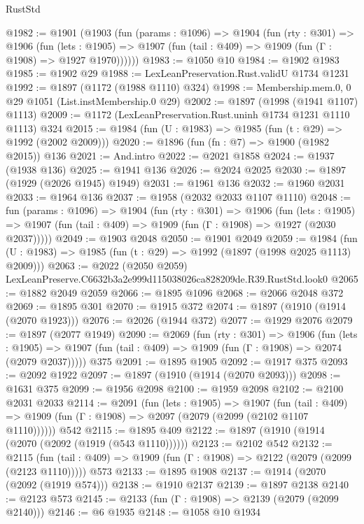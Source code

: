 \begin{lexlean}{RustStd}
\begin{coremodule}
@1982 := @1901
    (@1903
      (fun (params : @1096) =>
      @1904
        (fun (rty : @301) =>
        @1906
          (fun (lets : @1905) =>
          @1907 (fun (tail : @409) => @1909 (fun (Γ : @1908) => @1927 @1970))))))
@1983 := @1050 @10
@1984 := @1902 @1983
@1985 := @1902 @29
@1988 := LexLeanPreservation.Rust.validU @1734 @1231
@1992 := @1897 (@1172 (@1988 @1110) @324)
@1998 := Membership.mem.{0, 0} @29 @1051 (List.instMembership.{0} @29)
@2002 := @1897 (@1998 (@1941 @1107) @1113)
@2009 := @1172 (LexLeanPreservation.Rust.uninh @1734 @1231 @1110 @1113) @324
@2015 := @1984 (fun (U : @1983) => @1985 (fun (t : @29) => @1992 (@2002 @2009)))
@2020 := @1896 (fun (fn : @7) => @1900 (@1982 @2015)) @136
@2021 := And.intro
@2022 := @2021 @1858
@2024 := @1937 (@1938 @136)
@2025 := @1941 @136
@2026 := @2024 @2025
@2030 := @1897 (@1929 (@2026 @1945) @1949)
@2031 := @1961 @136
@2032 := @1960 @2031
@2033 := @1964 @136
@2037 := @1958 (@2032 @2033 @1107 @1110)
@2048 := fun (params : @1096) =>
  @1904
    (fun (rty : @301) =>
    @1906
      (fun (lets : @1905) =>
      @1907 (fun (tail : @409) => @1909 (fun (Γ : @1908) => @1927 (@2030 @2037)))))
@2049 := @1903 @2048
@2050 := @1901 @2049
@2059 := @1984 (fun (U : @1983) => @1985 (fun (t : @29) => @1992 (@1897 (@1998 @2025 @1113) @2009)))
@2063 := @2022 (@2050 @2059) LexLeanPreserve.C6632b3a2e999d115038026ca828209de.R39.RustStd.look0
@2065 := @1882 @2049 @2059
@2066 := @1895 @1096
@2068 := @2066 @2048 @372
@2069 := @1895 @301
@2070 := @1915 @372
@2074 := @1897 (@1910 (@1914 (@2070 @1923)))
@2076 := @2026 (@1944 @372)
@2077 := @1929 @2076
@2079 := @1897 (@2077 @1949)
@2090 := @2069
    (fun (rty : @301) =>
    @1906
      (fun (lets : @1905) =>
      @1907 (fun (tail : @409) => @1909 (fun (Γ : @1908) => @2074 (@2079 @2037)))))
    @375
@2091 := @1895 @1905
@2092 := @1917 @375
@2093 := @2092 @1922
@2097 := @1897 (@1910 (@1914 (@2070 @2093)))
@2098 := @1631 @375
@2099 := @1956 @2098
@2100 := @1959 @2098
@2102 := @2100 @2031 @2033
@2114 := @2091
    (fun (lets : @1905) =>
    @1907
      (fun (tail : @409) => @1909 (fun (Γ : @1908) => @2097 (@2079 (@2099 (@2102 @1107 @1110))))))
    @542
@2115 := @1895 @409
@2122 := @1897 (@1910 (@1914 (@2070 (@2092 (@1919 (@543 @1110))))))
@2123 := @2102 @542
@2132 := @2115
    (fun (tail : @409) => @1909 (fun (Γ : @1908) => @2122 (@2079 (@2099 (@2123 @1110)))))
    @573
@2133 := @1895 @1908
@2137 := @1914 (@2070 (@2092 (@1919 @574)))
@2138 := @1910 @2137
@2139 := @1897 @2138
@2140 := @2123 @573
@2145 := @2133 (fun (Γ : @1908) => @2139 (@2079 (@2099 @2140)))
@2146 := @6 @1935
@2148 := @1058 @10 @1934

\end{coremodule}
\end{lexlean}
